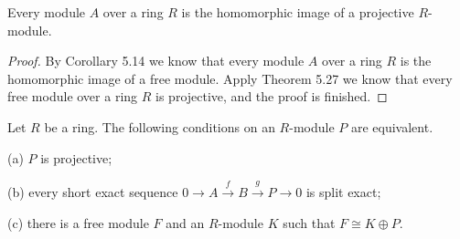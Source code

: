 \begin{corollary}
Every module $A$ over a ring $R$ is the homomorphic image of a projective $R$-module.
\end{corollary}
\begin{proof}
By Corollary 5.14 we know that every module $A$ over a ring $R$ is the homomorphic image of a free module. Apply Theorem 5.27 we know that every free module over a ring $R$ is projective, and the proof is finished.
\end{proof}
\begin{theorem}
Let $R$ be a ring. The following conditions on an $R$-module $P$ are equivalent.\par
(a) $P$ is projective;\par
(b) every short exact sequence $0\longrightarrow A\overset{f}{\longrightarrow}B\overset{g}{\longrightarrow}P\longrightarrow 0$ is split exact;\par
(c) there is a free module $F$ and an $R$-module $K$ such that $F\cong K\oplus P$.
\end{theorem}
